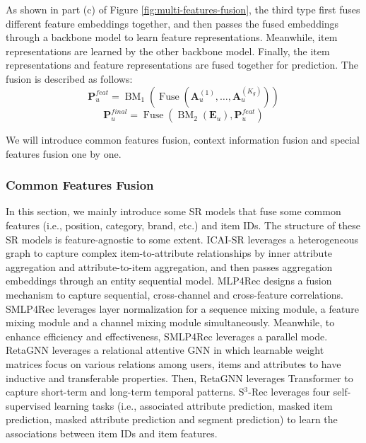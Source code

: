 \documentclass[review]{fcs}
\begin{document}
	As shown in part (c) of Figure \ref{fig:multi-features-fusion}, the third type first fuses different feature embeddings together, and then passes the fused embeddings through a backbone model to learn feature representations. Meanwhile, item representations are learned by the other backbone model. Finally, the item representations and feature representations are fused together for prediction. The fusion is described as follows:
	\begin{equation}
		\mathbf{P}_{u}^{feat} = \operatorname{BM}_1(\operatorname{Fuse}(\mathbf{A}_{u}^{(1)},\ldots,\mathbf{A}_{u}^{(K_{g})}))
	\end{equation}
	\begin{equation}
		\mathbf{P}_{u}^{final} = \operatorname{Fuse}(\operatorname{BM}_2(\mathbf{E}_{u}),\mathbf{P}_{u}^{feat})
	\end{equation}

	We will introduce common features fusion, context information fusion and special features fusion one by one.
	\subsubsection{Common Features Fusion}
	In this section, we mainly introduce some SR models that fuse some common features (i.e., position, category, brand, etc.) and item IDs. The structure of these SR models is feature-agnostic to some extent. ICAI-SR \cite{ICAI-SR} leverages a heterogeneous graph to capture complex item-to-attribute relationships by  inner attribute aggregation and attribute-to-item aggregation, and then passes aggregation embeddings through an entity sequential model. MLP4Rec \cite{MLP4Rec}  designs a fusion mechanism to capture sequential, cross-channel and cross-feature correlations. SMLP4Rec \cite{SMLP4Rec}  leverages layer normalization for a sequence mixing module, a feature mixing module and a channel mixing module simultaneously. Meanwhile, to enhance efficiency and effectiveness, SMLP4Rec leverages a parallel mode. RetaGNN \cite{RetaGNN} leverages a relational attentive GNN in which learnable weight matrices focus on various relations among users, items and attributes to have inductive and transferable properties. Then, RetaGNN \cite{RetaGNN} leverages Transformer to capture short-term and long-term temporal patterns. S$^{3}$-Rec \cite{S3-Rec} leverages four self-supervised learning tasks (i.e., associated attribute prediction, masked item prediction, masked attribute prediction and segment prediction) to learn the associations between item IDs and item features. 
	
\end{document}
